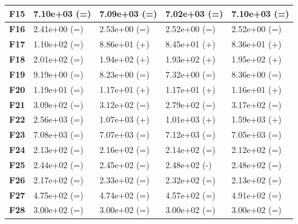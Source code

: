 \documentclass[12pt,a4paper]{report}
\begin{document}
{{{{{{{\begin{table}[h]
\begin{tabular}{|l|l|l|l|l|}
{\bf F15} & 7.10e+03 (=)        & 7.09e+03 (=)       & 7.02e+03 (=)      & 7.10e+03 (=)      \\ \hline
{\bf F16} & 2.41e+00 (=)        & 2.53e+00 (=)       & 2.52e+00 (=)      & 2.52e+00 (=)      \\ \hline
{\bf F17} & 1.10e+02 (=)        & 8.86e+01 (+)       & 8.45e+01 (+)      & 8.36e+01 (+)      \\ \hline
{\bf F18} & 2.01e+02 (=)        & 1.94e+02 (+)       & 1.93e+02 (+)      & 1.95e+02 (+)      \\ \hline
{\bf F19} & 9.19e+00 (=)        & 8.23e+00 (=)       & 7.32e+00 (=)      & 8.36e+00 (=)      \\ \hline
{\bf F20} & 1.19e+01 (=)        & 1.17e+01 (+)       & 1.17e+01 (+)      & 1.16e+01 (+)      \\ \hline
{\bf F21} & 3.09e+02 (=)        & 3.12e+02 (=)       & 2.79e+02 (=)      & 3.17e+02 (=)      \\ \hline
{\bf F22} & 2.56e+03 (=)        & 1.07e+03 (+)       & 1.01e+03 (+)      & 1.59e+03 (+)      \\ \hline
{\bf F23} & 7.08e+03 (=)        & 7.07e+03 (=)       & 7.12e+03 (=)      & 7.05e+03 (=)      \\ \hline
{\bf F24} & 2.13e+02 (=)        & 2.16e+02 (=)       & 2.14e+02 (=)      & 2.12e+02 (=)      \\ \hline
{\bf F25} & 2.44e+02 (=)        & 2.45e+02 (=)       & 2.48e+02 (-)      & 2.48e+02 (=)      \\ \hline
{\bf F26} & 2.17e+02 (=)        & 2.33e+02 (=)       & 2.32e+02 (=)      & 2.13e+02 (=)      \\ \hline
{\bf F27} & 4.75e+02 (=)        & 4.74e+02 (=)       & 4.57e+02 (=)      & 4.91e+02 (=)      \\ \hline
{\bf F28} & 3.00e+02 (=)        & 3.00e+02 (=)       & 3.00e+02 (=)      & 3.00e+02 (=)      \\ \hline
\end{tabular}
\end{table}

}}}}}}}
\end{document}
